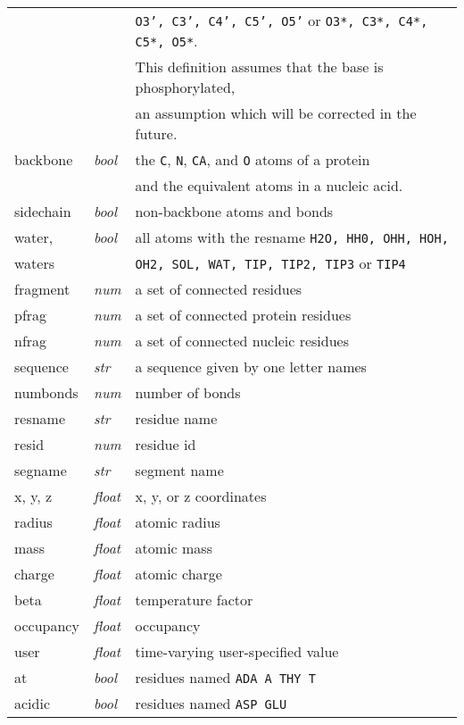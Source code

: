 \begin{table}[htb]
\begin{tabular}{|p{.9 in}| p{.4 in}| p{4.5in}| }
              &             & {\tt O3', C3', C4', C5', O5'} or {\tt O3*, C3*, C4*, C5*, O5*}. \\
              &             & This definition assumes that  the base is phosphorylated, \\
              &             & an assumption which will be corrected in the future. \\
backbone      & {\it bool}  & the {\tt C}, {\tt N}, {\tt CA}, and {\tt O} atoms of a protein \\
              &             & and the equivalent atoms in a nucleic acid. \\
sidechain     & {\it bool}  & non-backbone atoms and bonds \\
water,        & {\it bool}  & all atoms with the resname {\tt H2O, HH0, OHH, HOH, } \\
waters        &             & {\tt OH2, SOL, WAT, TIP, TIP2, TIP3} or {\tt TIP4} \\
fragment      & {\it num}   & a set of connected residues \\
pfrag         & {\it num}   & a set of connected protein residues \\
nfrag         & {\it num}   & a set of connected nucleic residues \\
sequence      & {\it str}   & a sequence given by one letter names \\
numbonds      & {\it num}   & number of bonds \\
resname       & {\it str}   & residue name \\
resid         & {\it num}   & residue id \\
segname       & {\it str}   & segment name \\
x, y, z       & {\it float} & x, y, or z coordinates \\
radius        & {\it float} & atomic radius \\
mass          & {\it float} & atomic mass \\
charge        & {\it float} & atomic charge \\
beta          & {\it float} & temperature factor \\
occupancy     & {\it float} & occupancy \\ 
user          & {\it float} & time-varying user-specified value \\
at            & {\it bool}  & residues named  {\tt ADA A THY T} \\
acidic        & {\it bool}  & residues named {\tt ASP GLU} \\

\end{tabular}
\end{table}
